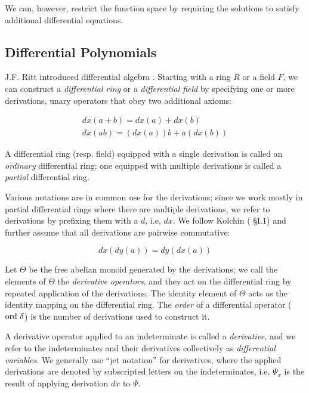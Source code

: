 \documentclass{article}
\theoremstyle{definition}
\theoremstyle{plain}
\begin{document}
We can, however, restrict the function space by requiring the solutions
to satisfy additional differential equations.

\subsection{Differential Polynomials}

J.F. Ritt introduced differential algebra \cite{Ritt}.
Starting with a ring $R$ or a field $F$, we can construct a
{\it differential ring} or a {\it differential field}
by specifying one or more derivations, unary operators that
obey two additional axioms:

\begin{equation*}
\begin{gathered}
dx(a+b) = dx(a) + dx(b) \\
dx(ab) = (dx(a))b + a(dx(b))
\end{gathered}
\end{equation*}

A differential ring (resp. field) equipped with a single derivation
is called an {\it ordinary} differential ring; one
equipped with multiple derivations is called a {\it partial}
differential ring.

Various notations are in common use for the derivations;
since we work mostly in partial differential rings where there are multiple
derivations, we refer to derivations by prefixing
them with a $d$, i.e, $dx$.  We follow Kolchin (\cite{Kolchin} \S I.1)
and further assume that all derivations are pairwise commutative:

\begin{equation*}
dx(dy(a)) = dy(dx(a))
\end{equation*}

Let $\Theta$ be the free abelian monoid generated by the derivations;
we call the elements of $\Theta$ the {\it derivative operators}, and they act on
the differential ring by repeated application of the derivations.
The identity element of $\Theta$ acts as the identity mapping on the differential ring.
The {\it order} of a differential operator (${\rm ord}\ \delta$) is the number of derivations used to construct it.

A derivative operator applied to an indeterminate is called a {\it derivative},
and we refer to the indeterminates and their derivatives collectively as {\it differential variables}.
We generally use ``jet notation'' for derivatives,
where the applied derivations
are denoted by subscripted letters on the indeterminates, i.e, $\Psi_x$
is the result of applying derivation $dx$ to $\Psi$.
\end{document}
